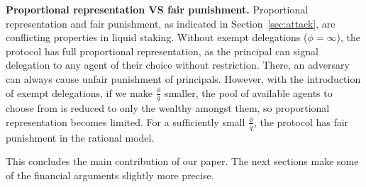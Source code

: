 \noindent
\textbf{Proportional representation VS fair punishment.}
Proportional representation and fair punishment, as indicated in
Section~\ref{sec:attack}, are conflicting properties in liquid
staking. Without exempt delegations ($\phi = \infty$),
the protocol has full proportional representation, as the principal can
signal delegation to any agent of their choice without restriction. There,
an adversary can always cause unfair punishment of principals.
However, with the introduction of exempt delegations, if we make
$\frac{\phi}{q}$ smaller, the pool of available agents to choose from is reduced to
only the wealthy amongst them, so proportional representation
becomes limited. For a sufficiently small $\frac{\phi}{q}$,
the protocol has fair punishment in the rational model.

\ifproceedings
\else
  This concludes the main contribution of our paper. The next
  sections make some of the financial arguments slightly more precise.
\fi


%
%

